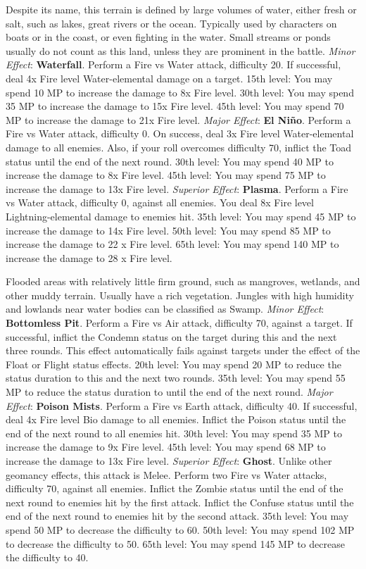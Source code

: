 \begin{multicols}{2}
    Despite its name, this terrain is defined by large volumes of water, either fresh or salt, such as lakes, great rivers or the ocean. Typically used by characters on boats or in the coast, or even fighting in the water. Small streams or ponds usually do not count as this land, unless they are prominent in the battle.
	\textit{Minor Effect}: \textbf{Waterfall}. Perform a Fire vs Water attack, difficulty 20. If successful, deal 4x Fire level Water-elemental damage on a target. 15th level: You may spend 10 MP to increase the damage to 8x Fire level. 30th level: You may spend 35 MP to increase the damage to 15x Fire level. 45th level: You may spend 70 MP to increase the damage to 21x Fire level.
	\textit{Major Effect}: \textbf{El Niño}. Perform a Fire vs Water attack, difficulty 0. On success, deal 3x Fire level Water-elemental damage to all enemies. Also, if your roll overcomes difficulty 70, inflict the Toad status until the end of the next round. 30th level: You may spend 40 MP to increase the damage to 8x Fire level. 45th level: You may spend 75 MP to increase the damage to 13x Fire level.
	\textit{Superior Effect}: \textbf{Plasma}. Perform a Fire vs Water attack, difficulty 0, against all enemies. You deal 8x Fire level Lightning-elemental damage to enemies hit. 35th level: You may spend 45 MP to increase the damage to 14x Fire level. 50th level: You may spend 85 MP to increase the damage to 22 x Fire level. 65th level: You may spend 140 MP to increase the damage to 28 x Fire level.

    \ferrum

    Flooded areas with relatively little firm ground, such as mangroves, wetlands, and other muddy terrain. Usually have a rich vegetation. Jungles with high humidity and lowlands near water bodies can be classified as Swamp.
	\textit{Minor Effect}: \textbf{Bottomless Pit}. Perform a Fire vs Air attack, difficulty 70, against a target. If successful, inflict the Condemn status on the target during this and the next three rounds. This effect automatically fails against targets under the effect of the Float or Flight status effects. 20th level: You may spend 20 MP to reduce the status duration to this and the next two rounds. 35th level: You may spend 55 MP to reduce the status duration to until the end of the next round.
	\textit{Major Effect}: \textbf{Poison Mists}. Perform a Fire vs Earth attack, difficulty 40. If successful, deal 4x Fire level Bio damage to all enemies. Inflict the Poison status until the end of the next round to all enemies hit. 30th level: You may spend 35 MP to increase the damage to 9x Fire level. 45th level: You may spend 68 MP to increase the damage to 13x Fire level.
	\textit{Superior Effect}: \textbf{Ghost}. Unlike other geomancy effects, this attack is Melee. Perform two Fire vs Water attacks, difficulty 70, against all enemies. Inflict the Zombie status until the end of the next round to enemies hit by the first attack. Inflict the Confuse status until the end of the next round to enemies hit by the second attack. 35th level: You may spend 50 MP to decrease the difficulty to 60. 50th level: You may spend 102 MP to decrease the difficulty to 50. 65th level: You may spend 145 MP to decrease the difficulty to 40.


\end{multicols}
